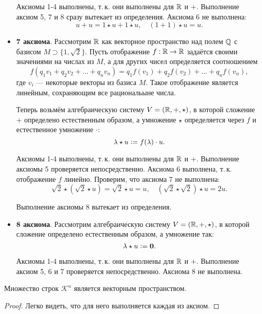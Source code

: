 \begin{remark}
\begin{itemize}
            Аксиомы 1-4 выполнены, т.\,к. они выполнены для $\mathbb{R}$ и $+$. Выполнение аксиом 5, 7 и 8 сразу вытекает из определения. Аксиома 6 не выполнена:
            $$
            u + u = 1 \star u + 1 \star u,\quad (1 + 1) \star u = u.
            $$
        \item \textbf{7 аксиома}. Рассмотрим $\mathbb{R}$ как векторное пространство над полем $\mathbb{Q}$ с базисом $M \supset \{1, \sqrt{2}\}$. Пусть отображение $f: \mathbb{R} \rightarrow \mathbb{R}$ задаётся своими значениями на числах из $M$, а для других чисел определяется соотношением
            $$
            f(q_1v_1 + q_2v_2 + \ldots + q_nv_n) = q_1f(v_1) + q_2f(v_2) + \ldots + q_nf(v_n),
            $$
            где $v_i$ --- некоторые векторы из базиса $M$. Такое отображение является линейным, сохраняющим все рациональыне числа.

            Теперь возьмём алгебраическую систему $V = (\mathbb{R}, +, \star)$, в которой сложение $+$ определено естественным образом, а умножение $\star$ определяется через $f$ и естественное умножение $\boldsymbol{\cdot}$:
            $$
            \lambda \star u \vcentcolon = f(\lambda) \cdot u.
            $$

            Аксиомы 1-4 выполнены, т.\,к. они выполнены для $\mathbb{R}$ и $+$. Выполнение аксиомы 5 проверяется непосредственно. Аксиома 6 выполнена, т.\,к. отображение $f$ линейно. Проверим, что аксиома 7 не выполнена:
            $$
            \sqrt{2} \star (\sqrt{2} \star u) = \sqrt{2} \star u = u,\quad (\sqrt{2} \star \sqrt{2}) \star u = 2u.
            $$

            Выполнение аксиомы 8 вытекает из определения.
        \item \textbf{8 аксиома}. Рассмотрим алгебраическую систему $V = (\mathbb{R}, +, \star)$, в которой сложение определено естественным образом, а умножение так:
            $$
            \lambda \star u \vcentcolon = \boldsymbol{0}.
            $$

            Аксиомы 1-4 выполнены, т.\,к. они выполнены для $\mathbb{R}$ и $+$. Выполнение аксиом 5, 6 и 7 проверяется непосредственно. Аксиома 8 не выполнена.
    \end{itemize}
\end{remark}

\begin{theorem}
    Множество строк $\mathcal{K}^n$ является векторным пространством.
\end{theorem}

\begin{proof}
    Легко видеть, что для него выполняется каждая из аксиом.
\end{proof}

